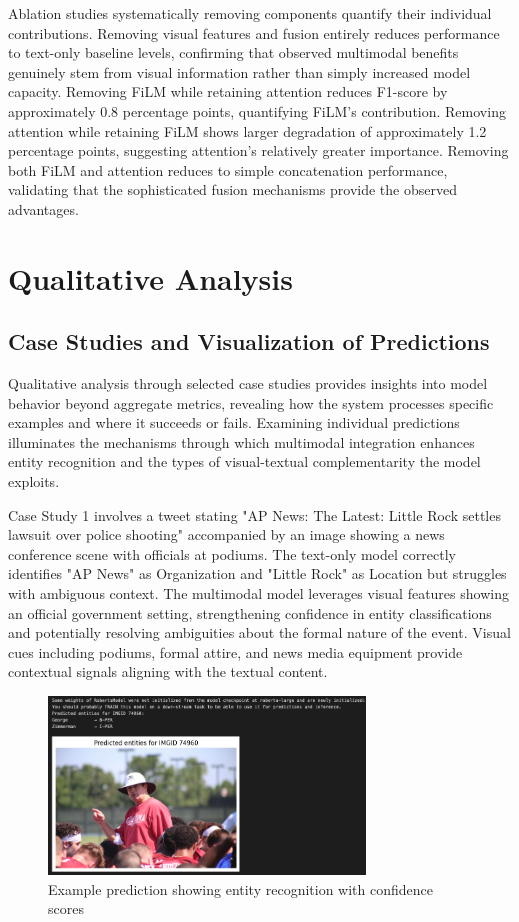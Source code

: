 \documentclass[12pt,a4paper]{report}
\begin{document}
Ablation studies systematically removing components quantify their individual contributions. Removing visual features and fusion entirely reduces performance to text-only baseline levels, confirming that observed multimodal benefits genuinely stem from visual information rather than simply increased model capacity. Removing FiLM while retaining attention reduces F1-score by approximately 0.8 percentage points, quantifying FiLM's contribution. Removing attention while retaining FiLM shows larger degradation of approximately 1.2 percentage points, suggesting attention's relatively greater importance. Removing both FiLM and attention reduces to simple concatenation performance, validating that the sophisticated fusion mechanisms provide the observed advantages.

\section{Qualitative Analysis}

\subsection{Case Studies and Visualization of Predictions}

Qualitative analysis through selected case studies provides insights into model behavior beyond aggregate metrics, revealing how the system processes specific examples and where it succeeds or fails. Examining individual predictions illuminates the mechanisms through which multimodal integration enhances entity recognition and the types of visual-textual complementarity the model exploits.

Case Study 1 involves a tweet stating "AP News: The Latest: Little Rock settles lawsuit over police shooting" accompanied by an image showing a news conference scene with officials at podiums. The text-only model correctly identifies "AP News" as Organization and "Little Rock" as Location but struggles with ambiguous context. The multimodal model leverages visual features showing an official government setting, strengthening confidence in entity classifications and potentially resolving ambiguities about the formal nature of the event. Visual cues including podiums, formal attire, and news media equipment provide contextual signals aligning with the textual content.

\begin{figure}[H]
\centering
\includegraphics[width=0.75\textwidth]{prediction.png}
\caption{Example prediction showing entity recognition with confidence scores}
\label{fig:prediction1}
\end{figure}
\end{document}

